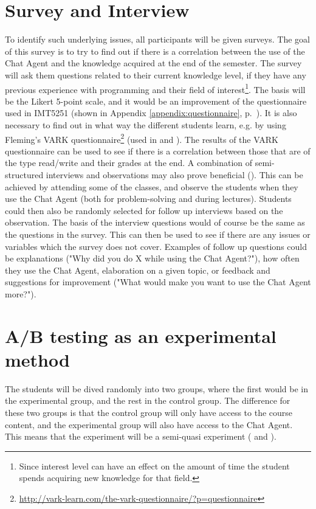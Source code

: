 \section{Survey and Interview}
\label{chapter4:survey_and_interview}
To identify such underlying issues, all participants will be given surveys. The goal of this survey is to try to find out if there is a correlation between the use of the 
Chat Agent and the knowledge acquired at the end of the semester. The survey will ask them questions related to their current knowledge level, if they have any previous 
experience with programming and their field of interest\footnote{Since interest level can have an effect on the amount of time the student spends acquiring new knowledge 
	for that field.}. The basis will be the Likert 5-point scale, and it would be an improvement of the questionnaire used in IMT5251 (shown in Appendix \ref{appendix:questionnaire}, 
p.~\pageref{appendix:questionnaire}). It is also necessary to find out in what way the different students learn, e.g. by using Fleming's VARK 
 questionnaire\footnote{\url{http://vark-learn.com/the-vark-questionnaire/?p=questionnaire}} (used in \citet[p.~152]{Kowalski2013} and \citet{Sarabdeen2013}). 
The results of the VARK questionnaire can be used to see if there is a correlation between those that are of the type read/write and their grades at the end.
\vspace{0.5em}\newline
A combination of semi-structured interviews and observations may also prove beneficial (\citet{Fincher2011}). This can be achieved by attending some of the classes, and 
observe the students when they use the Chat Agent (both for problem-solving and during lectures). Students could then also be randomly selected for follow up interviews 
based on the observation. The basis of the interview questions would of course be the same as the questions in the survey. This can then be used to see if there are any 
issues or variables which the survey does not cover. Examples of follow up questions could be explanations ("Why did you do X while using the Chat Agent?"), how often 
they use the Chat Agent, elaboration on a given topic, or feedback and suggestions for improvement ("What would make you want to use the Chat Agent more?"). 

\section{A/B testing as an experimental method}
\label{chapter4:ab_testing_experimental}
The students will be dived randomly into two groups, where the first would be in the experimental group, and the rest in the control group. The difference for these two 
groups is that the control group will only have access to the course content, and the experimental group will also have access to the Chat Agent. This means that the experiment 
will be a semi-quasi experiment (\citet[p.~226-248]{Leedy2012} and \citet[p.~114-115]{Ringdal2007}).

